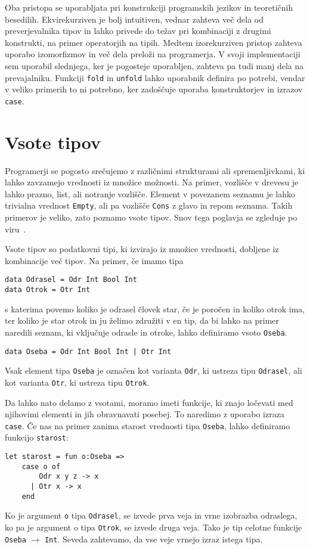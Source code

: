 \documentclass[12pt,a4paper,openany]{book}
\begin{document}
Oba pristopa se uporabljata pri konstrukciji programskih jezikov in teoretičnih besedilih. Ekvirekurziven je bolj intuitiven, vednar zahteva več dela od preverjevalnika tipov in 
lahko privede do težav pri kombinaciji z drugimi konstrukti, na primer operatorjih na tipih. Medtem izorekurziven pristop zahteva uporabo izomorfizmov in več dela preloži na programerja. 
V svoji implementaciji sem uporabil slednjega, ker je pogosteje uporabljen, zahteva pa tudi manj dela na prevajalniku. Funkciji \lstinline{fold} in \lstinline{unfold} lahko uporabnik definira po potrebi, 
vendar v veliko primerih to ni potrebno, ker zadoščuje uporaba konstruktorjev in izrazov \lstinline{case}.

\chapter{Vsote tipov}
Programerji se pogosto srečujemo z različnimi strukturami ali spremenljivkami, ki lahko zavzamejo vrednosti iz množice možnosti. Na primer, vozlišče v drevesu je lahko prazno, list, ali 
notranje vozlišče. Element v povezanem seznamu je lahko trivialna vrednost \lstinline{Empty}, ali pa vozlišče \lstinline{Cons} z glavo in repom seznama. Takih primerov je veliko, zato poznamo vsote tipov. 
Snov tega poglavja se zgleduje po viru~\cite{Pie02}.

Vsote tipov so podatkovni tipi, ki izvirajo iz množice vrednosti, dobljene iz kombinacije več tipov. Na primer, če imamo tipa
\begin{lstlisting}
data Odrasel = Odr Int Bool Int
data Otrok = Otr Int
\end{lstlisting}
s katerima povemo koliko je odrasel človek star, če je poročen in koliko otrok ima, ter koliko je star otrok in ju želimo združiti v en tip, da bi lahko na primer naredili seznam, ki vključuje odrasle in otroke, lahko definiramo vsoto \lstinline{Oseba}.
\begin{lstlisting}
data Oseba = Odr Int Bool Int | Otr Int
\end{lstlisting}
Vsak element tipa \lstinline{Oseba} je označen kot varianta \lstinline{Odr}, ki ustreza tipu \lstinline{Odrasel}, ali kot varianta \lstinline{Otr}, ki ustreza tipu \lstinline{Otrok}.

Da lahko nato delamo z vsotami, moramo imeti funkcije, ki znajo ločevati med njihovimi elementi in jih obravnavati posebej. To naredimo z uporabo izraza \lstinline{case}. Če nas na primer zanima 
starost vrednosti tipa \lstinline{Oseba}, lahko definiramo funkcijo \lstinline{starost}:
\begin{lstlisting}
let starost = fun o:Oseba =>
    case o of
        Odr x y z -> x
      | Otr x -> x
    end
\end{lstlisting}
Ko je argument \lstinline{o} tipa \lstinline{Odrasel}, se izvede prva veja in vrne izobrazba odraslega, ko pa je argument o tipa \lstinline{Otrok}, se izvede druga veja. Tako je tip celotne funkcije 
\lstinline{Oseba} $\rightarrow$ \lstinline{Int}. Seveda zahtevamo, da vse veje vrnejo izraz istega tipa.
\end{document}
